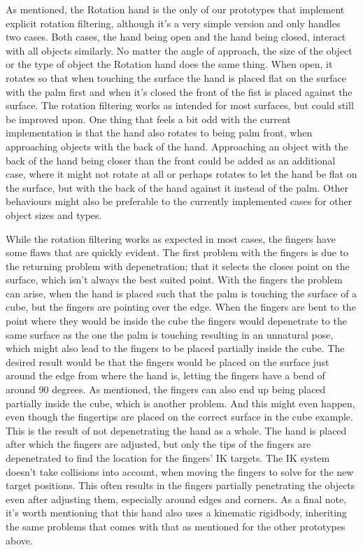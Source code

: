 As mentioned, the Rotation hand is the only of our prototypes that implement explicit rotation filtering, although it's a very simple version and only handles two cases. Both cases, the hand being open and the hand being closed, interact with all objects similarly. No matter the angle of approach, the size of the object or the type of object the Rotation hand does the same thing. When open, it rotates so that when touching the surface the hand is placed flat on the surface with the palm first and when it's closed the front of the fist is placed against the surface. The rotation filtering works as intended for most surfaces, but could still be improved upon. One thing that feels a bit odd with the current implementation is that the hand also rotates to being palm front, when approaching objects with the back of the hand. Approaching an object with the back of the hand being closer than the front could be added as an additional case, where it might not rotate at all or perhaps rotates to let the hand be flat on the surface, but with the back of the hand against it instead of the palm. Other behaviours might also be preferable to the currently implemented cases for other object sizes and types.

While the rotation filtering works as expected in most cases, the fingers have some flaws that are quickly evident. The first problem with the fingers is due to the returning problem with depenetration; that it selects the closes point on the surface, which isn't always the best suited point. With the fingers the problem can arise, when the hand is placed such that the palm is touching the surface of a cube, but the fingers are pointing over the edge. When the fingers are bent to the point where they would be inside the cube the fingers would depenetrate to the same surface as the one the palm is touching resulting in an unnatural pose, which might also lead to the fingers to be placed partially inside the cube. The desired result would be that the fingers would be placed on the surface just around the edge from where the hand is, letting the fingers have a bend of around 90 degrees. As mentioned, the fingers can also end up being placed partially inside the cube, which is another problem. And this might even happen, even though the fingertips are placed on the correct surface in the cube example. This is the result of not depenetrating the hand as a whole. The hand is placed after which the fingers are adjusted, but only the tips of the fingers are depenetrated to find the location for the fingers' IK targets. The IK system doesn't take collisions into account, when moving the fingers to solve for the new target positions. This often results in the fingers partially penetrating the objects even after adjusting them, especially around edges and corners. As a final note, it's worth mentioning that this hand also uses a kinematic rigidbody, inheriting the same problems that comes with that as mentioned for the other prototypes above.

